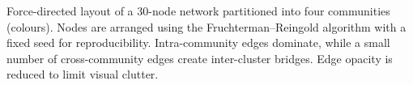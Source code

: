 \caption{Force-directed layout of a 30-node network partitioned into four communities (colours). Nodes are arranged using the Fruchterman--Reingold algorithm with a fixed seed for reproducibility. Intra-community edges dominate, while a small number of cross-community edges create inter-cluster bridges. Edge opacity is reduced to limit visual clutter.}

